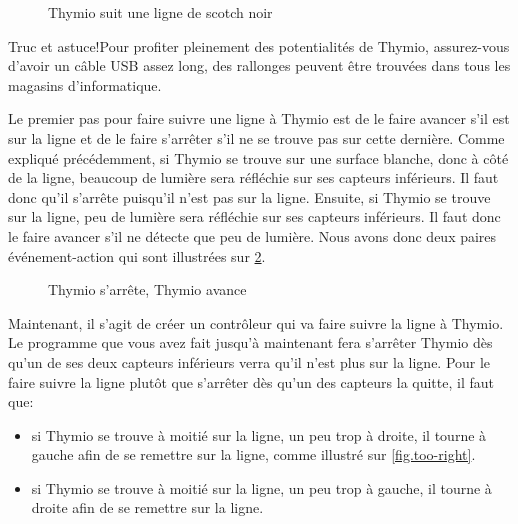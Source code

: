 \begin{figure}
\begin{center}
\caption{Thymio suit une ligne de scotch noir}\label{fig.tape}
\end{center}
\end{figure}


\begin{bclogo}[couleur = blue!30, arrondi = 0.1, logo = \bcinfo, ombre = true]{Truc et astuce!}Pour profiter pleinement des potentialités de Thymio, assurez-vous d'avoir un câble USB assez long, des rallonges peuvent être trouvées dans tous les magasins d'informatique.
\end{bclogo}


Le premier pas pour faire suivre une ligne à Thymio est de le faire avancer s'il est sur la ligne et de le faire s'arrêter s'il ne se trouve pas sur cette dernière. Comme expliqué précédemment, si Thymio se trouve sur une surface blanche, donc à côté de la ligne, beaucoup de lumière sera réfléchie sur ses capteurs inférieurs. Il faut donc qu'il s'arrête puisqu'il n'est pas sur la ligne. Ensuite, si Thymio se trouve sur la ligne, peu de lumière sera réfléchie sur ses capteurs inférieurs. Il faut donc le faire avancer s'il ne détecte que peu de lumière. Nous avons donc deux paires événement-action qui sont illustrées sur \cref{fig.start-stop}.

\begin{figure}[h]
\begin{center}
\caption{Thymio s'arrête, Thymio avance}\label{fig.start-stop}
\end{center}
\end{figure}


Maintenant, il s'agit de créer un contrôleur qui va faire suivre la ligne à Thymio. Le programme que vous avez fait jusqu'à maintenant fera s'arrêter Thymio dès qu'un de ses deux capteurs inférieurs verra qu'il n'est plus sur la ligne. Pour le faire suivre la ligne plutôt que s'arrêter dès qu'un des capteurs la quitte, il faut que: 

\begin{itemize}
	\item si Thymio se trouve à moitié sur la ligne, un peu trop à droite, il tourne à gauche afin de se remettre sur la ligne, comme illustré sur \cref{fig.too-right}.
	\item  si Thymio se trouve à moitié sur la ligne, un peu trop à gauche, il tourne à droite afin de se remettre sur la ligne.
\end{itemize}

